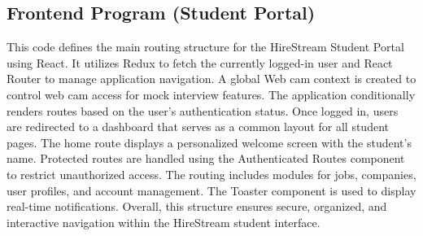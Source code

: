 \documentclass[a4paper, 12pt]{report}
\begin{document}
\subsection{\textbf{Frontend Program (Student Portal)}}

This code defines the main routing structure for the HireStream Student Portal using React. It utilizes Redux to fetch the currently logged-in user and React Router to manage application navigation. A global Web cam context is created to control web cam access for mock interview features. The application conditionally renders routes based on the user’s authentication status. Once logged in, users are redirected to a dashboard that serves as a common layout for all student pages. The home route displays a personalized welcome screen with the student’s name. Protected routes are handled using the Authenticated Routes component to restrict unauthorized access. The routing includes modules for jobs, companies, user profiles, and account management. The Toaster component is used to display real-time notifications. Overall, this structure ensures secure, organized, and interactive navigation within the HireStream student interface.
\end{document}

